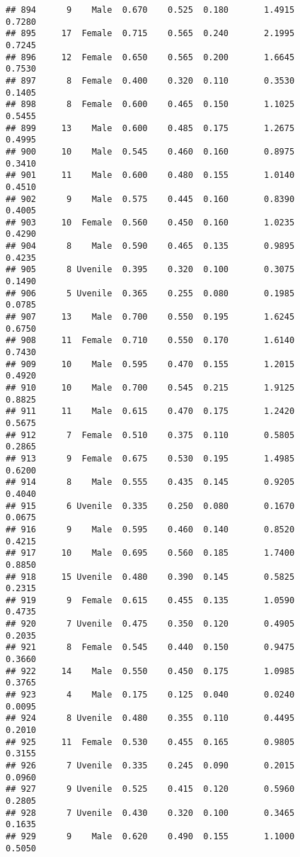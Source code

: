 \documentclass[
]{article}
\begin{document}
\begin{verbatim}
## 894      9    Male  0.670    0.525  0.180       1.4915         0.7280
## 895     17  Female  0.715    0.565  0.240       2.1995         0.7245
## 896     12  Female  0.650    0.565  0.200       1.6645         0.7530
## 897      8  Female  0.400    0.320  0.110       0.3530         0.1405
## 898      8  Female  0.600    0.465  0.150       1.1025         0.5455
## 899     13    Male  0.600    0.485  0.175       1.2675         0.4995
## 900     10    Male  0.545    0.460  0.160       0.8975         0.3410
## 901     11    Male  0.600    0.480  0.155       1.0140         0.4510
## 902      9    Male  0.575    0.445  0.160       0.8390         0.4005
## 903     10  Female  0.560    0.450  0.160       1.0235         0.4290
## 904      8    Male  0.590    0.465  0.135       0.9895         0.4235
## 905      8 Uvenile  0.395    0.320  0.100       0.3075         0.1490
## 906      5 Uvenile  0.365    0.255  0.080       0.1985         0.0785
## 907     13    Male  0.700    0.550  0.195       1.6245         0.6750
## 908     11  Female  0.710    0.550  0.170       1.6140         0.7430
## 909     10    Male  0.595    0.470  0.155       1.2015         0.4920
## 910     10    Male  0.700    0.545  0.215       1.9125         0.8825
## 911     11    Male  0.615    0.470  0.175       1.2420         0.5675
## 912      7  Female  0.510    0.375  0.110       0.5805         0.2865
## 913      9  Female  0.675    0.530  0.195       1.4985         0.6200
## 914      8    Male  0.555    0.435  0.145       0.9205         0.4040
## 915      6 Uvenile  0.335    0.250  0.080       0.1670         0.0675
## 916      9    Male  0.595    0.460  0.140       0.8520         0.4215
## 917     10    Male  0.695    0.560  0.185       1.7400         0.8850
## 918     15 Uvenile  0.480    0.390  0.145       0.5825         0.2315
## 919      9  Female  0.615    0.455  0.135       1.0590         0.4735
## 920      7 Uvenile  0.475    0.350  0.120       0.4905         0.2035
## 921      8  Female  0.545    0.440  0.150       0.9475         0.3660
## 922     14    Male  0.550    0.450  0.175       1.0985         0.3765
## 923      4    Male  0.175    0.125  0.040       0.0240         0.0095
## 924      8 Uvenile  0.480    0.355  0.110       0.4495         0.2010
## 925     11  Female  0.530    0.455  0.165       0.9805         0.3155
## 926      7 Uvenile  0.335    0.245  0.090       0.2015         0.0960
## 927      9 Uvenile  0.525    0.415  0.120       0.5960         0.2805
## 928      7 Uvenile  0.430    0.320  0.100       0.3465         0.1635
## 929      9    Male  0.620    0.490  0.155       1.1000         0.5050

\end{verbatim}
\end{document}
